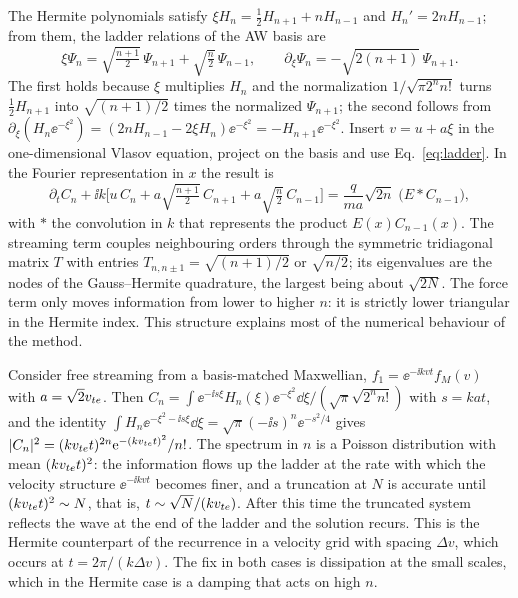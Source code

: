 The Hermite polynomials satisfy $\xi H_n=\tfrac12H_{n+1}+nH_{n-1}$ and $H_n'=2nH_{n-1}$; from them, the ladder relations of the AW basis are
\begin{equation}
\xi\Psi_n=\sqrt{\tfrac{n+1}{2}}\,\Psi_{n+1}+\sqrt{\tfrac n2}\,\Psi_{n-1},\qquad \partial_\xi\Psi_n=-\sqrt{2(n+1)}\,\Psi_{n+1} .\label{eq:ladder}
\end{equation}
The first holds because $\xi$ multiplies $H_n$ and the normalization $1/\sqrt{\pi2^nn!}$ turns $\tfrac12H_{n+1}$ into $\sqrt{(n+1)/2}$ times the normalized $\Psi_{n+1}$; the second follows from $\partial_\xi(H_n\ee^{-\xi^2})=(2nH_{n-1}-2\xi H_n)\ee^{-\xi^2}=-H_{n+1}\ee^{-\xi^2}$. Insert $v=u+a\xi$ in the one-dimensional Vlasov equation, project on the basis and use Eq.~\eqref{eq:ladder}. In the Fourier representation in $x$ the result is
\begin{equation}
\partial_tC_n+\ii k\Big[u\,C_n+a\sqrt{\tfrac{n+1}{2}}\,C_{n+1}+a\sqrt{\tfrac n2}\,C_{n-1}\Big]=\frac{q}{ma}\sqrt{2n}\;\big(E\ast C_{n-1}\big) ,\label{eq:hierarchy}
\end{equation}
with $\ast$ the convolution in $k$ that represents the product $E(x)C_{n-1}(x)$. The streaming term couples neighbouring orders through the symmetric tridiagonal matrix $T$ with entries $T_{n,n\pm1}=\sqrt{(n+1)/2}$ or $\sqrt{n/2}$; its eigenvalues are the nodes of the Gauss--Hermite quadrature, the largest being about $\sqrt{2N}$. The force term only moves information from lower to higher $n$: it is strictly lower triangular in the Hermite index. This structure explains most of the numerical behaviour of the method.

Consider free streaming from a basis-matched Maxwellian, $f_1=\ee^{-\ii kvt}f_M(v)$ with $a=\sqrt2v_{te}$. Then $C_n=\int\ee^{-\ii s\xi}H_n(\xi)\ee^{-\xi^2}\dd\xi/(\sqrt\pi\sqrt{2^nn!})$ with $s=kat$, and the identity $\int H_n\ee^{-\xi^2-\ii s\xi}\dd\xi=\sqrt\pi(-\ii s)^n\ee^{-s^2/4}$ gives $|C_n|^2=(kv_{te} t)^{2n}\mathrm{e}^{-(kv_{te} t)^2}/n!$. The spectrum in $n$ is a Poisson distribution with mean $(kv_{te} t)^2$: the information flows up the ladder at the rate with which the velocity structure $\ee^{-\ii kvt}$ becomes finer, and a truncation at $N$ is accurate until $(kv_{te} t)^2\sim N$, that is, $t\sim\sqrt N/(kv_{te})$. After this time the truncated system reflects the wave at the end of the ladder and the solution recurs. This is the Hermite counterpart of the recurrence in a velocity grid with spacing $\Delta v$, which occurs at $t=2\pi/(k\Delta v)$. The fix in both cases is dissipation at the small scales, which in the Hermite case is a damping that acts on high $n$.


